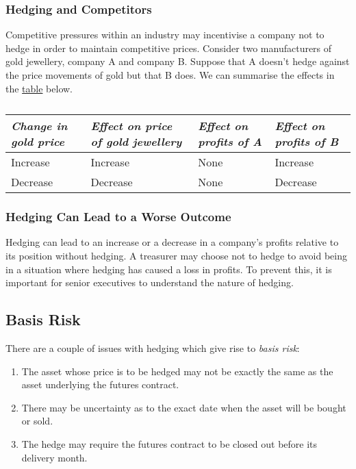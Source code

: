 \subsubsection*{Hedging and Competitors}

Competitive pressures within an industry may incentivise a company not to hedge in order to maintain competitive prices. Consider two manufacturers of gold jewellery, company A and company B. Suppose that A doesn't hedge against the price movements of gold but that B does. We can summarise the effects in the \hyperref[tab:2]{table} below.

\begin{table}[h]
    \centering
    \begin{tabular}{|l|l|l|l|}
        \hline
        \emph{Change in gold price} & \emph{Effect on price of gold jewellery} & \emph{Effect on profits of A} & \emph{Effect on profits of B}\\\hline
        Increase & Increase & None & Increase \\
        Decrease & Decrease & None & Decrease \\\hline
    \end{tabular}
    \caption{}
    \label{tab:2}
\end{table}

\subsubsection*{Hedging Can Lead to a Worse Outcome}

Hedging can lead to an increase or a decrease in a company's profits relative to its position without hedging. A treasurer may choose not to hedge to avoid being in a situation where hedging has caused a loss in profits. To prevent this, it is important for senior executives to understand the nature of hedging.

\subsection{Basis Risk}


There are a couple of issues with hedging which give rise to \emph{basis risk}:
\begin{enumerate}
    \item The asset whose price is to be hedged may not be exactly the same as the asset underlying the futures contract.
    \item There may be uncertainty as to the exact date when the asset will be bought or sold.
    \item The hedge may require the futures contract to be closed out before its delivery month.
\end{enumerate}

